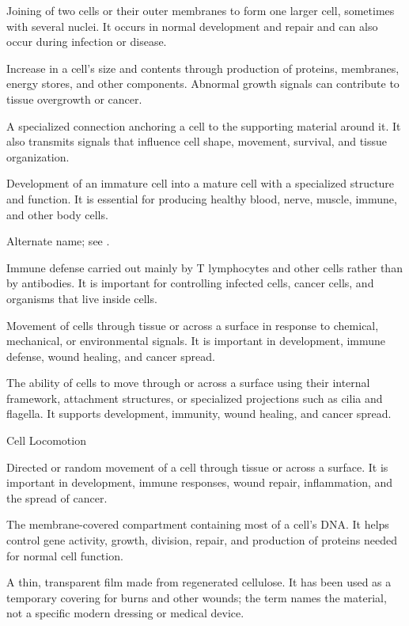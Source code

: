  Joining of two cells or their outer membranes to form one larger cell, sometimes with several nuclei. It occurs in normal development and repair and can also occur during infection or disease.

 Increase in a cell's size and contents through production of proteins, membranes, energy stores, and other components. Abnormal growth signals can contribute to tissue overgrowth or cancer.

 A specialized connection anchoring a cell to the supporting material around it. It also transmits signals that influence cell shape, movement, survival, and tissue organization.

 Development of an immature cell into a mature cell with a specialized structure and function. It is essential for producing healthy blood, nerve, muscle, immune, and other body cells.

 Alternate name; see .

 Immune defense carried out mainly by T lymphocytes and other cells rather than by antibodies. It is important for controlling infected cells, cancer cells, and organisms that live inside cells.

 Movement of cells through tissue or across a surface in response to chemical, mechanical, or environmental signals. It is important in development, immune defense, wound healing, and cancer spread.

 The ability of cells to move through or across a surface using their internal framework, attachment structures, or specialized projections such as cilia and flagella. It supports development, immunity, wound healing, and cancer spread.

\synonyms
Cell Locomotion

 Directed or random movement of a cell through tissue or across a surface. It is important in development, immune responses, wound repair, inflammation, and the spread of cancer.

 The membrane-covered compartment containing most of a cell's DNA. It helps control gene activity, growth, division, repair, and production of proteins needed for normal cell function.

 A thin, transparent film made from regenerated cellulose. It has been used as a temporary covering for burns and other wounds; the term names the material, not a specific modern dressing or medical device.

